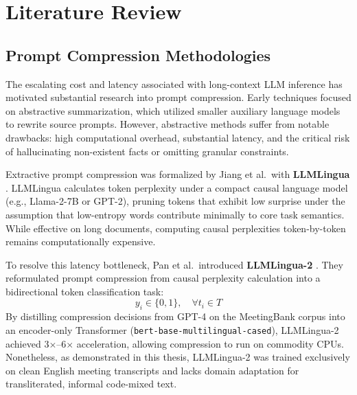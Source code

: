 
\chapter{Literature Review}
\label{chap:literature}

\section{Prompt Compression Methodologies}
The escalating cost and latency associated with long-context LLM inference has motivated substantial research into prompt compression. Early techniques focused on abstractive summarization, which utilized smaller auxiliary language models to rewrite source prompts. However, abstractive methods suffer from notable drawbacks: high computational overhead, substantial latency, and the critical risk of hallucinating non-existent facts or omitting granular constraints.

Extractive prompt compression was formalized by Jiang et al.\ with \textbf{LLMLingua} \cite{jiang2023llmlingua}. LLMLingua calculates token perplexity under a compact causal language model (e.g., Llama-2-7B or GPT-2), pruning tokens that exhibit low surprise under the assumption that low-entropy words contribute minimally to core task semantics. While effective on long documents, computing causal perplexities token-by-token remains computationally expensive.

To resolve this latency bottleneck, Pan et al.\ introduced \textbf{LLMLingua-2} \cite{pan2024llmlingua2}. They reformulated prompt compression from causal perplexity calculation into a bidirectional token classification task:
\begin{equation}
    y_i \in \{0, 1\}, \quad \forall t_i \in T
\end{equation}
By distilling compression decisions from GPT-4 on the MeetingBank corpus into an encoder-only Transformer (\texttt{bert-base-multilingual-cased}), LLMLingua-2 achieved 3$\times$--6$\times$ acceleration, allowing compression to run on commodity CPUs. Nonetheless, as demonstrated in this thesis, LLMLingua-2 was trained exclusively on clean English meeting transcripts and lacks domain adaptation for transliterated, informal code-mixed text.

